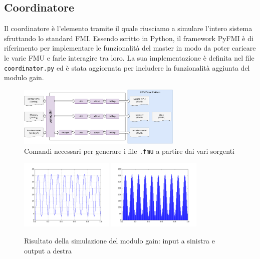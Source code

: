\documentclass[]{IEEEtran}
\newcommand{\code}[1]{\texttt{#1}}
\begin{document}
\subsection{Coordinatore}
Il coordinatore \`e l'elemento tramite il quale riusciamo a simulare l'intero sistema sfruttando lo standard FMI.
Essendo scritto in Python, il framework PyFMI\cite{PyFMI} \`e di riferimento per implementare le funzionalit\`a del 
master in modo da poter caricare le varie FMU e farle interagire tra loro.
La sua implementazione \`e definita nel file \code{coordinator.py} ed \`e stata aggiornata per includere la
funzionalit\`a aggiunta del modulo gain.

\begin{figure}[h]
    \centering
    \includegraphics[width=0.7\textwidth]{figures/schema}
	\caption{Comandi necessari per generare i file \code{.fmu} a partire dai vari sorgenti}
	\label{fig:schema}
\end{figure}

\begin{figure}[h]
    \centering
    \includegraphics[width=0.4\textwidth]{figures/figure_2.png}
    \includegraphics[width=0.4\textwidth]{figures/figure_1.png}
    \caption{Risultato della simulazione del modulo gain: input a sinistra e output a destra}
    \label{fig:results}
\end{figure}
\end{document}
